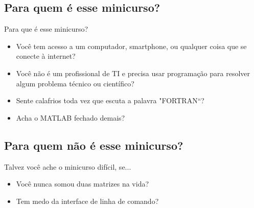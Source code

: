 \documentclass{beamer}
\begin{document}
   
   \subsection{Para quem é esse minicurso?}
   \begin{frame}{Para que é esse minicurso?}
    \begin{itemize}
     \item Você tem acesso a um computador, smartphone, ou qualquer coisa que se conecte à internet? \pause
     \item Você não é um profissional de TI e precisa usar programação para resolver algum problema técnico ou científico? \pause
     \item Sente calafrios toda vez que escuta a palavra "FORTRAN``? \pause
     \item Acha o MATLAB\textsuperscript{\circledR} fechado demais?
    \end{itemize}
   \end{frame}
   
   \subsection{Para quem não é esse minicurso?}
   \begin{frame}{Talvez você ache o minicurso difícil, se...}
    \begin{itemize}
     \item Você nunca somou duas matrizes na vida? \pause
     \item Tem medo da interface de linha de comando? \pause
    \end{itemize}
   \end{frame}
   
   
\end{document}
